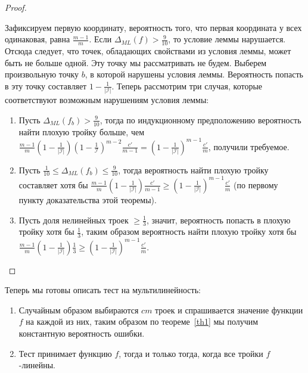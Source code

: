 \documentclass[12pt,fleqn,a4paper]{book}
\begin{document}
\begin{proof}
\begin{enumerate}
		 Зафиксируем первую координату, вероятность того, что первая координата у всех одинаковая, равна $\frac{m-1}{m}$. 
		 Если $\Delta_{ML}(f) > \frac{9}{10}$, то условие леммы нарушается. Отсюда следует, что
		 точек, обладающих свойствами из условия леммы, может быть не больше одной. Эту точку мы рассматривать не будем. 
		 Выберем произвольную точку $b$, в которой нарушены условия леммы. Вероятность попасть в эту точку составляет 
		 $1 - \frac{1}{|\mathcal{I}|}$. Теперь рассмотрим три случая, которые соответствуют 
		 возможным нарушениям условия леммы:
		 \begin{enumerate}
			\item Пусть $\Delta_{ML}(f_b) > \frac{9}{10}$, тогда по индукционному предположению вероятность найти плохую тройку больше, чем \\
			$\frac{m-1}{m} (1 - \frac{1}{|\mathcal{I}|})(1-\frac{1}{\mathcal{I}})^{m-2} \frac{c'}{m-1} = 
			(1 - \frac{1}{|\mathcal{I}|})^{m-1} \frac{c'}{m}$, получили требуемое.
			\item Пусть $\frac{1}{10} \le \Delta_{ML}(f_b) \le \frac{9}{10}$, тогда вероятность найти плохую тройку составляет хотя бы 
			$\frac{m-1}{m} (1 - \frac{1}{|\mathcal{I}|}) \frac{c'}{m-1} \ge (1 - \frac{1}{|\mathcal{I}|})^{m-1} \frac{c'}{m}$ 
			(по первому пункту доказательства этой теоремы).
			\item Пусть доля нелинейных троек $\ge \frac{1}{3}$, значит, вероятность попасть в плохую тройку хотя бы $\frac{1}{3}$, 
			таким образом вероятность найти плохую тройку 
			хотя бы $\frac{m-1}{m} (1 - \frac{1}{|\mathcal{I}|}) \frac{1}{3} \ge (1 - \frac{1}{|\mathcal{I}|})^{m-1} \frac{c'}{m}$.
		 \end{enumerate}
 	\end{enumerate}
\end{proof}

Теперь мы готовы описать тест на мультилинейность:
\begin{enumerate}	
	\item Случайным образом выбираются $cm$ троек и спрашивается значение функции $f$ на каждой из них, 
	таким образом по теореме~\ref{th1} мы получим константную вероятность ошибки.
	\item Тест принимает функцию $f$, тогда и только тогда, когда все тройки $f$-линейны.
\end{enumerate}
\end{document}
